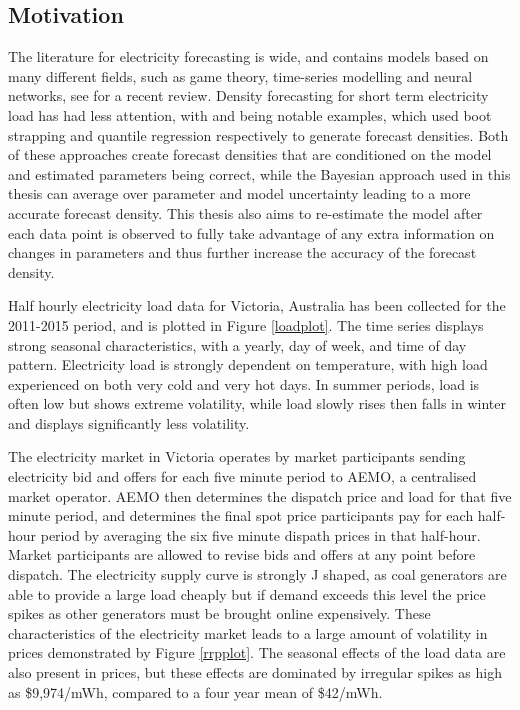 \documentclass[12pt,a4paper]{article}%
\numberwithin{equation}{section}
\begin{document}
\subsection{Motivation}

The literature for electricity forecasting is wide, and contains models based on many different fields, such as game theory, time-series modelling and neural networks, see \citet{Weron2014} for a recent review. Density forecasting for short term electricity load has had less attention, with \citet{Fan2012} and \citet{He2016} being notable examples, which used boot strapping and quantile regression respectively to generate forecast densities. Both of these approaches create forecast densities that are conditioned on the model and estimated parameters being correct, while the Bayesian approach used in this thesis can average over parameter and model uncertainty leading to a more accurate forecast density. This thesis also aims to re-estimate the model after each data point is observed to fully take advantage of any extra information on changes in parameters and thus further increase the accuracy of the forecast density. 

Half hourly electricity load data for Victoria, Australia has been collected for the 2011-2015 period, and is plotted in Figure \ref{loadplot}. The time series displays strong seasonal characteristics, with a yearly, day of week, and time of day pattern. Electricity load is strongly dependent on temperature, with high load experienced on both very cold and very hot days. In summer periods, load is often low but shows extreme volatility, while load slowly rises then falls in winter and displays significantly less volatility. 

The electricity market in Victoria operates by market participants sending electricity bid and offers for each five minute period to  AEMO, a centralised market operator. AEMO then determines the dispatch price and load for that five minute period, and determines the final spot price participants pay for each half-hour period by averaging the six five minute dispath prices in that half-hour. Market participants are allowed to revise bids and offers at any point before dispatch. The electricity supply curve is strongly J shaped, as coal generators are able to provide a large load cheaply but if demand exceeds this level the price spikes as other generators must be brought online expensively. These characteristics of the electricity market leads to a large amount of volatility in prices demonstrated by Figure \ref{rrpplot}. The seasonal effects of the load data are also present in prices, but these effects are dominated by irregular spikes as high as \$9,974/mWh, compared to a four year mean of \$42/mWh.
\end{document}

